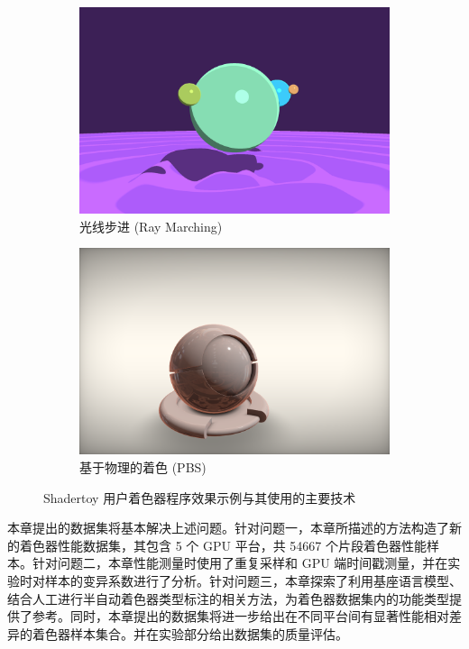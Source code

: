 {\begin{figure}[htbp]
  \begin{minipage}[b]{\textwidth}
      \begin{subfigure}[b]{0.48\textwidth}
          \includegraphics[width=\textwidth]{figures/shadertoy_raymarching.png}
          \caption{光线步进 (Ray Marching)}
          \label{fig:sub_raymarching}
      \end{subfigure}
      \hfill %
      \begin{subfigure}[b]{0.48\textwidth}
          \includegraphics[width=\textwidth]{figures/shadertoy_pbr.png}
          \caption{基于物理的着色 (PBS)}
          \label{fig:sub_pbs}
      \end{subfigure}
  \end{minipage}
  
  \caption{Shadertoy 用户\cite{ShdrToyUser1, ShdrToyUser2}着色器程序效果示例与其使用的主要技术}
  \label{fig:shadertoy_gallery_ch3}
\end{figure}


本章提出的数据集将基本解决上述问题。针对问题一，本章所描述的方法构造了新的着色器性能数据集，其包含 5 个 GPU 平台，共 54667 个片段着色器性能样本。针对问题二，本章性能测量时使用了重复采样和 GPU 端时间戳测量，并在实验时对样本的变异系数进行了分析。针对问题三，本章探索了利用基座语言模型、结合人工进行半自动着色器类型标注的相关方法，为着色器数据集内的功能类型提供了参考。同时，本章提出的数据集将进一步给出在不同平台间有显著性能相对差异的着色器样本集合。并在实验部分给出数据集的质量评估。
}

